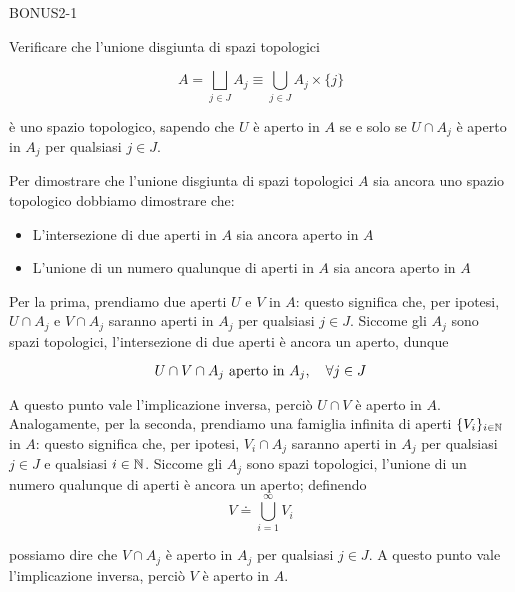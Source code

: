 {BONUS2-1}
{
Verificare che l'unione disgiunta di spazi topologici

\begin{equation}
	A = \bigsqcup_{j \in J} A_{j} \equiv \bigcup_{j \in J} A_{j} \times \{j\}
\end{equation}

è uno spazio topologico, sapendo che $ U $ è aperto in $ A $ se e solo se $ U \cap A_{j} $ è aperto in $ A_{j} $ per qualsiasi $ j \in J $.
}
{
Per dimostrare che l'unione disgiunta di spazi topologici $ A $ sia ancora uno spazio topologico dobbiamo dimostrare che:

\begin{itemize}
	\item L'intersezione di due aperti in $ A $ sia ancora aperto in $ A $
	
	\item L'unione di un numero qualunque di aperti in $ A $ sia ancora aperto in $ A $
\end{itemize}

Per la prima, prendiamo due aperti $ U $ e $ V $ in $ A $: questo significa che, per ipotesi, $ U \cap A_{j} $ e $ V \cap A_{j} $ saranno aperti in $ A_{j} $ per qualsiasi $ j \in J $. Siccome gli $ A_{j} $ sono spazi topologici, l'intersezione di due aperti è ancora un aperto, dunque

\begin{equation}
	U \cap V \cap A_{j} \text{ aperto in } A_{j} \qcomma \forall j \in J
\end{equation}

A questo punto vale l'implicazione inversa, perciò $ U \cap V $ è aperto in $ A $. \\
Analogamente, per la seconda, prendiamo una famiglia infinita di aperti $ \{V_{i}\}_{i \in \mathbb{N}} $ in $ A $: questo significa che, per ipotesi, $ V_{i} \cap A_{j} $ saranno aperti in $ A_{j} $ per qualsiasi $ j \in J $ e qualsiasi $ i \in \mathbb{N} $. Siccome gli $ A_{j} $ sono spazi topologici, l'unione di un numero qualunque di aperti è ancora un aperto; definendo
%
\begin{equation}
	V \doteq \bigcup_{i=1}^{\infty} V_{i}
\end{equation}

possiamo dire che $ V \cap A_{j} $ è aperto in $ A_{j} $ per qualsiasi $ j \in J $. A questo punto vale l'implicazione inversa, perciò $ V $ è aperto in $ A $.
}


